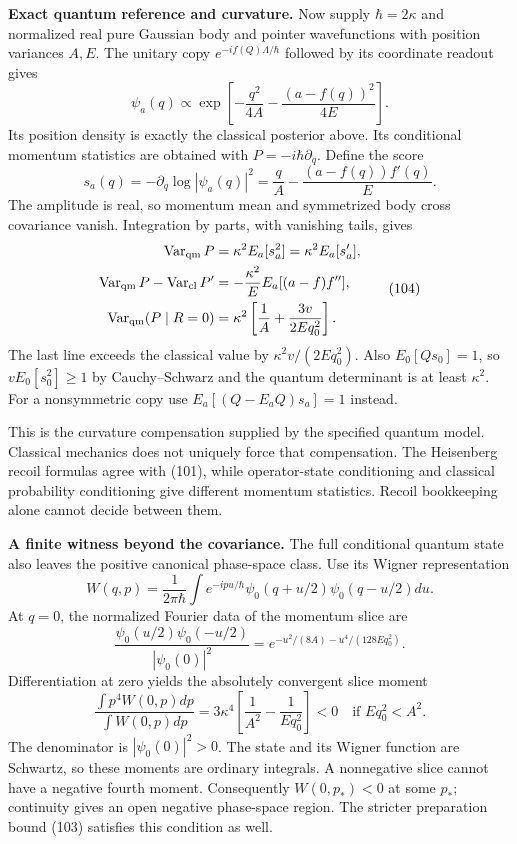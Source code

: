 \documentclass[11pt,a4paper]{article}
\begin{document}
\textbf{Exact quantum reference and curvature.} Now supply
\(\hbar=2\kappa\) and normalized real pure Gaussian body and pointer
wavefunctions with position variances \(A,E\). The unitary copy
\(e^{-if(Q)\Lambda/\hbar}\) followed by its coordinate readout gives
\[\psi_a(q)\propto
 \exp\left[-\frac{q^2}{4A}-\frac{(a-f(q))^2}{4E}\right].\] Its position
density is exactly the classical posterior above. Its conditional
momentum statistics are obtained with \(P=-i\hbar\partial_q\). Define
the score \[s_a(q)=-\partial_q\log|\psi_a(q)|^2
 =\frac qA-\frac{(a-f(q))f'(q)}E.\] The amplitude is real, so momentum
mean and symmetrized body cross covariance vanish. Integration by parts,
with vanishing tails, gives \[\begin{aligned}
\operatorname{Var}_{\rm qm}P
 &=\kappa^2E_a[s_a^2]=\kappa^2E_a[s_a'],\\
\operatorname{Var}_{\rm qm}P-\operatorname{Var}_{\rm cl}P'
 &=-\frac{\kappa^2}{E}E_a[(a-f)f''],\\
\operatorname{Var}_{\rm qm}(P\mid R=0)
 &=\kappa^2\left[\frac1A+\frac{3v}{2Eq_0^2}\right].
\end{aligned}\tag{104}\] The last line exceeds the classical value by
\(\kappa^2v/(2Eq_0^2)\). Also \(E_0[Qs_0]=1\), so \(vE_0[s_0^2]\ge1\) by
Cauchy--Schwarz and the quantum determinant is at least \(\kappa^2\).
For a nonsymmetric copy use \(E_a[(Q-E_aQ)s_a]=1\) instead.

This is the curvature compensation supplied by the specified quantum
model. Classical mechanics does not uniquely force that compensation.
The Heisenberg recoil formulas agree with (101), while operator-state
conditioning and classical probability conditioning give different
momentum statistics. Recoil bookkeeping alone cannot decide between
them.

\textbf{A finite witness beyond the covariance.} The full conditional
quantum state also leaves the positive canonical phase-space class. Use
its Wigner representation \[W(q,p)=\frac1{2\pi\hbar}\int e^{-ipu/\hbar}
 \psi_0(q+u/2)\psi_0(q-u/2)du.\] At \(q=0\), the normalized Fourier data
of the momentum slice are
\[\frac{\psi_0(u/2)\psi_0(-u/2)}{|\psi_0(0)|^2}
 =e^{-u^2/(8A)-u^4/(128Eq_0^2)}.\] Differentiation at zero yields the
absolutely convergent slice moment
\[\frac{\int p^4W(0,p)dp}{\int W(0,p)dp}
 =3\kappa^4\left[\frac1{A^2}-\frac1{Eq_0^2}\right]<0
 \quad\text{if }Eq_0^2<A^2.\tag{105}\] The denominator is
\(|\psi_0(0)|^2>0\). The state and its Wigner function are Schwartz, so
these moments are ordinary integrals. A nonnegative slice cannot have a
negative fourth moment. Consequently \(W(0,p_*)<0\) at some \(p_*\);
continuity gives an open negative phase-space region. The stricter
preparation bound (103) satisfies this condition as well.
\end{document}
